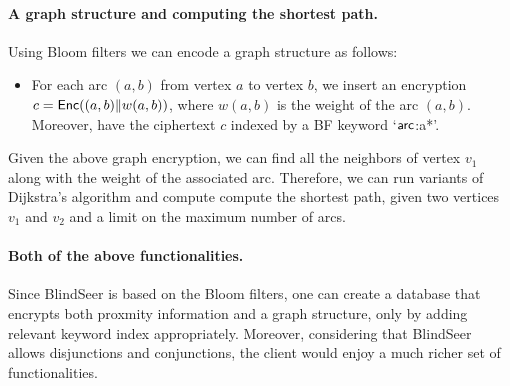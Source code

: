 \paragraph{A graph structure and computing the shortest path.}
Using Bloom filters we can encode a graph structure as follows:
\begin{itemize}
\item For each arc $(a, b)$ from vertex $a$ to vertex $b$, we insert an
  encryption $c = \mathsf{Enc}((a,b) \| w(a,b) )$, where $w(a,b)$ is the weight of the arc
    $(a,b)$. Moreover, have the ciphertext $c$ indexed by a BF keyword `$\sf arc$:a*'. 
\end{itemize}

Given the above graph encryption, we can find all the neighbors of vertex $v_1$
along with the weight of the associated arc. Therefore, we can run variants of
Dijkstra's algorithm and compute compute the shortest path, given two vertices
$v_1$ and $v_2$ and a limit on the maximum number of arcs. 

\paragraph{Both of the above functionalities.}
Since BlindSeer is based on the Bloom filters, one can create a database that
encrypts both proxmity information and a graph structure, only by adding
relevant keyword index appropriately.
%
Moreover, considering that BlindSeer allows disjunctions and conjunctions, the
client would enjoy a much richer set of functionalities.  

